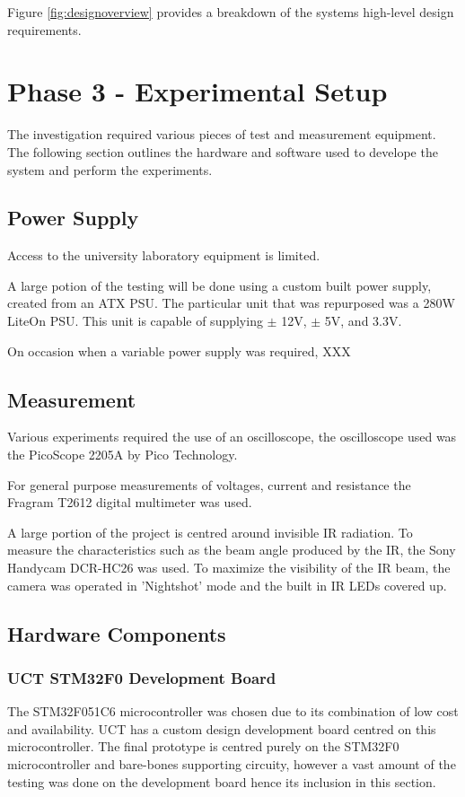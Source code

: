 Figure \ref{fig:designoverview} provides a breakdown of the systems high-level design requirements.



\section{Phase 3 - Experimental Setup}

The investigation required various pieces of test and measurement equipment. The following section outlines the hardware and software used to develope the system and perform the experiments.

\subsection{Power Supply}
Access to the university laboratory equipment is limited.

A large potion of the testing will be done using a custom built power supply, created from an ATX PSU. The particular unit that was repurposed was a 280W LiteOn PSU. This unit is capable of supplying $\pm$ 12V, $\pm$ 5V, and 3.3V.

On occasion when a variable power supply was required, XXX

\subsection{Measurement}

Various experiments required the use of an oscilloscope, the oscilloscope used was the PicoScope 2205A by Pico Technology.

For general purpose measurements of voltages, current and resistance the Fragram T2612 digital multimeter was used.

A large portion of the project is centred around invisible IR radiation. To measure the characteristics such as the beam angle produced by the IR, the Sony Handycam DCR-HC26 was used. To maximize the visibility of the IR beam, the camera was operated in 'Nightshot' mode and the built in IR LEDs covered up.




\subsection{Hardware Components}

\subsubsection{UCT STM32F0 Development Board}
The STM32F051C6 microcontroller was chosen due to its combination of low cost and availability. UCT has a custom design development board centred on this microcontroller. The final prototype is centred purely on the STM32F0 microcontroller and bare-bones supporting circuity, however a vast amount of the testing was done on the development board hence its inclusion in this section.

